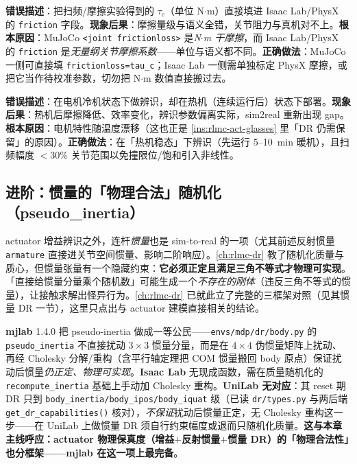 \begin{pitfall}
\textbf{错误描述}：把扫频/摩擦实验得到的 $\tau_c$（单位 N$\cdot$m）直接填进 Isaac Lab/PhysX 的 \verb|friction| 字段。\textbf{现象后果}：摩擦量级与语义全错，关节阻力与真机对不上。\textbf{根本原因}：MuJoCo \verb|<joint frictionloss>| 是\emph{N$\cdot$m 干摩擦}，而 Isaac Lab/PhysX 的 \verb|friction| 是\emph{无量纲关节摩擦系数}——单位与语义都不同。\textbf{正确做法}：MuJoCo 一侧可直接填 \verb|frictionloss=tau_c|；Isaac Lab 一侧需单独标定 PhysX 摩擦，或把它当作待校准参数，切勿把 N$\cdot$m 数值直接搬过去。
\end{pitfall}

\begin{pitfall}
\textbf{错误描述}：在电机冷机状态下做辨识，却在热机（连续运行后）状态下部署。\textbf{现象后果}：热机后摩擦降低、效率变化，辨识参数偏离实际，sim2real 重新出现 gap。\textbf{根本原因}：电机特性随温度漂移（这也正是 \cref{ins:rlmc-act-glasses} 里「DR 仍需保留」的原因）。\textbf{正确做法}：在「热机稳态」下辨识（先运行 5--10~min 暖机），且扫频幅度 $<30\%$ 关节范围以免撞限位/饱和引入非线性。
\end{pitfall}

\subsection{进阶：惯量的「物理合法」随机化（pseudo\_inertia）}
\label{sec:rlmc-act-inertia-dr}

actuator 增益辨识之外，连杆\emph{惯量}也是 sim-to-real 的一项（尤其前述反射惯量 \verb|armature| 直接进关节空间惯量、影响二阶响应）。\cref{ch:rlmc-dr} 教了随机化质量与质心，但惯量张量有一个隐藏约束：\textbf{它必须正定且满足三角不等式才物理可实现}。「直接给惯量分量乘个随机数」可能生成一个\emph{不存在的刚体}（违反三角不等式的惯量），让接触求解出怪异行为。\cref{ch:rlmc-dr} 已就此立了完整的三框架对照（见其惯量 DR 一节），这里只点出与 actuator 建模直接相关的结论。

\begin{insight}\label{ins:rlmc-act-pseudo-inertia}
\textbf{mjlab} 1.4.0 把 pseudo-inertia 做成一等公民——\verb|envs/mdp/dr/body.py| 的 \verb|pseudo_inertia| 不直接扰动 $3\times3$ 惯量分量，而是在 $4\times4$ 伪惯量矩阵上扰动、再经 Cholesky 分解/重构（含平行轴定理把 COM 惯量搬回 body 原点）保证扰动后惯量\emph{仍正定、物理可实现}。\textbf{Isaac Lab} 无现成函数，需在质量随机化的 \verb|recompute_inertia| 基础上手动加 Cholesky 重构。\textbf{UniLab 无对应}：其 reset 期 DR 只到 \verb|body_inertia/body_ipos/body_iquat| 级（已读 \verb|dr/types.py| 与两后端 \verb|get_dr_capabilities()| 核对），\emph{不保证}扰动后惯量正定，无 Cholesky 重构这一步——在 UniLab 上做惯量 DR 须自行约束幅度或退而只随机化质量。\textbf{这与本章主线呼应：actuator 物理保真度（增益$+$反射惯量$+$惯量 DR）的「物理合法性」也分框架——mjlab 在这一项上最完备}。
\end{insight}

